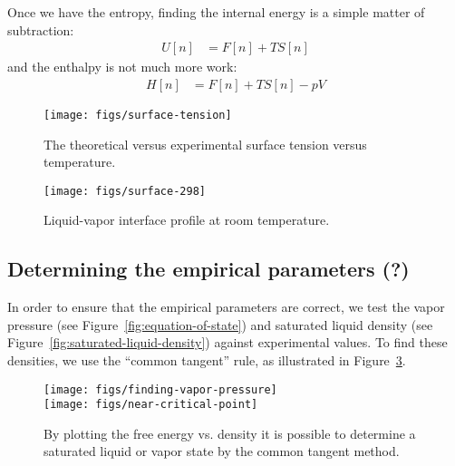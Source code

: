 \documentclass[letterpaper,twocolumn,amsmath,amssymb,prb]{revtex4-1}
\begin{document}
Once we have the entropy, finding the internal energy is a simple
matter of subtraction:
\begin{align}
  U[n] &= F[n] + TS[n]
\end{align}
and the enthalpy is not much more work:
\begin{align}
  H[n] &= F[n] + TS[n] - pV
\end{align}


\begin{figure}
\begin{center}
\texttt{[image: figs/surface-tension]}
\end{center}
\caption{The theoretical versus experimental surface tension
  versus temperature.  }
\label{fig:surface-tension}
\end{figure}

\begin{figure}
\begin{center}
\texttt{[image: figs/surface-298]}
\end{center}
\caption{Liquid-vapor interface profile at room temperature.  }
\label{fig:liquid-vapor-profile}
\end{figure}

\subsection{Determining the empirical parameters (?)}\label{sec:empirical}

In order to ensure that the empirical parameters are correct, we test
the vapor pressure (see Figure~\ref{fig:equation-of-state}) and
saturated liquid density (see
Figure~\ref{fig:saturated-liquid-density}) against experimental
values.  To find these densities, we use the ``common tangent'' rule,
as illustrated in Figure~\ref{fig:homogeneous}.

\begin{figure}
\begin{center}
\texttt{[image: figs/finding-vapor-pressure]}\\
\texttt{[image: figs/near-critical-point]}
\end{center}
\caption{By plotting the free energy vs. density it is possible to
  determine a saturated liquid or vapor state by the common tangent
  method.  }
\label{fig:homogeneous}
\end{figure}
\end{document}
